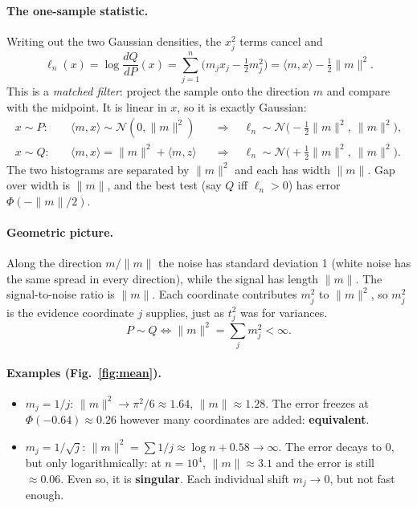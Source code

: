 \documentclass[11pt]{article}
\theoremstyle{definition}
\theoremstyle{remark}
\newcommand{\N}{\mathcal N}
\begin{document}
\paragraph{The one-sample statistic.}
Writing out the two Gaussian densities, the $x_j^2$ terms cancel and
\[
\ell_n(x)=\log\frac{dQ}{dP}(x)=\sum_{j=1}^n\Big(m_jx_j-\tfrac12 m_j^2\Big)=\langle m,x\rangle-\tfrac12\|m\|^2 .
\]
This is a \emph{matched filter}: project the sample onto the direction $m$ and compare with the
midpoint. It is linear in $x$, so it is exactly Gaussian:
\begin{align*}
x\sim P:&\quad \langle m,x\rangle\sim\N(0,\|m\|^2) &&\Rightarrow\quad \ell_n\sim\N\big(-\tfrac12\|m\|^2,\ \|m\|^2\big),\\
x\sim Q:&\quad \langle m,x\rangle=\|m\|^2+\langle m,z\rangle &&\Rightarrow\quad \ell_n\sim\N\big(+\tfrac12\|m\|^2,\ \|m\|^2\big).
\end{align*}
The two histograms are separated by $\|m\|^2$ and each has width $\|m\|$. Gap over width is $\|m\|$,
and the best test (say $Q$ iff $\ell_n>0$) has error $\Phi(-\|m\|/2)$.

\paragraph{Geometric picture.} Along the direction $m/\|m\|$ the noise has standard deviation 1
(white noise has the same spread in every direction), while the signal has length $\|m\|$. The
signal-to-noise ratio is $\|m\|$. Each coordinate contributes $m_j^2$ to $\|m\|^2$, so $m_j^2$ is
the evidence coordinate $j$ supplies, just as $t_j^2$ was for variances.
\[
P\sim Q\iff \|m\|^2=\sum_j m_j^2<\infty .
\]

\paragraph{Examples (Fig.~\ref{fig:mean}).}
\begin{itemize}
\item $m_j=1/j$: $\|m\|^2\to\pi^2/6\approx1.64$, $\|m\|\approx1.28$. The error freezes at
$\Phi(-0.64)\approx0.26$ however many coordinates are added: \textbf{equivalent}.
\item $m_j=1/\sqrt j$: $\|m\|^2=\sum 1/j\approx\log n+0.58\to\infty$. The error decays to 0, but only
logarithmically: at $n=10^4$, $\|m\|\approx3.1$ and the error is still $\approx0.06$. Even so, it is
\textbf{singular}. Each individual shift $m_j\to0$, but not fast enough.
\end{itemize}
\end{document}
